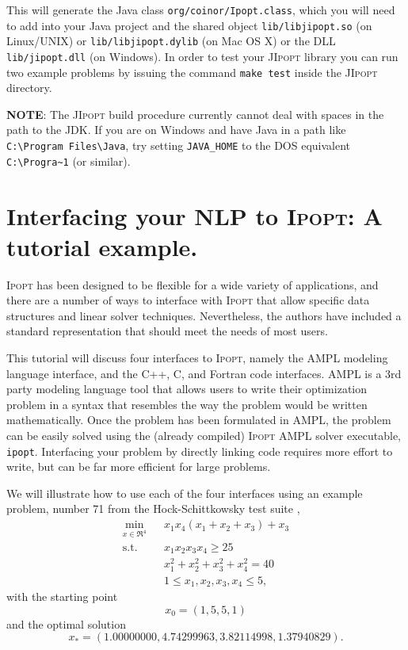 \documentclass[10pt]{article}
\newcommand{\Ipopt}{\textsc{Ipopt}\xspace}
\newcommand{\JIpopt}{\textsc{JIpopt}\xspace}
\begin{document}
This will generate the Java class {\tt org/coinor/Ipopt.class}, which you will 
need to add into your Java project and the shared object
{\tt lib/libjipopt.so} (on Linux/UNIX) or {\tt lib/libjipopt.dylib} (on Mac OS 
X) or the DLL {\tt lib/jipopt.dll} (on Windows).
In order to test your \JIpopt library you can run two example problems by 
issuing the command {\tt make test} inside the \JIpopt directory.

\textbf{NOTE}: The \JIpopt build procedure currently cannot deal with spaces 
in the path to the JDK. If you are on Windows and have Java in a path like 
\verb|C:\Program Files\Java|, try setting {\tt JAVA\_HOME} to the DOS 
equivalent \verb|C:\Progra~1| (or similar).

\section{Interfacing your NLP to \Ipopt: A tutorial example.}
\label{sec:tutorial-example}

\Ipopt has been designed to be flexible for a wide variety of
applications, and there are a number of ways to interface with \Ipopt
that allow specific data structures and linear solver
techniques. Nevertheless, the authors have included a standard
representation that should meet the needs of most users.

This tutorial will discuss four interfaces to \Ipopt, namely the AMPL
modeling language\cite{FouGayKer:AMPLbook} interface, and the C++, C,
and Fortran code interfaces.  AMPL is a 3rd party modeling language
tool that allows users to write their optimization problem in a syntax
that resembles the way the problem would be written mathematically.
Once the problem has been formulated in AMPL, the problem can be
easily solved using the (already compiled) \Ipopt AMPL solver
executable, {\tt ipopt}. Interfacing your problem by directly linking
code requires more effort to write, but can be far more efficient for
large problems.

We will illustrate how to use each of the four interfaces using an
example problem, number 71 from the Hock-Schittkowsky test suite \cite{HS},
  \begin{eqnarray}
    \min_{x \in \Re^4} &&x_1 x_4 (x_1 + x_2 + x_3)  +  x_3 \label{eq:ex_obj} \\
    \mbox{s.t.}  &&x_1 x_2 x_3 x_4 \ge 25 \label{eq:ex_ineq} \\
    &&x_1^2 + x_2^2 + x_3^2 + x_4^2  =  40 \label{eq:ex_equ} \\
    &&1 \leq x_1, x_2, x_3, x_4 \leq 5, \label{eq:ex_bounds}
  \end{eqnarray}
with the starting point
\begin{equation}
x_0 = (1, 5, 5, 1) \label{eq:ex_startpt}
\end{equation}
and the optimal solution
\[
x_* = (1.00000000, 4.74299963, 3.82114998, 1.37940829). \nonumber
\]
\end{document}
